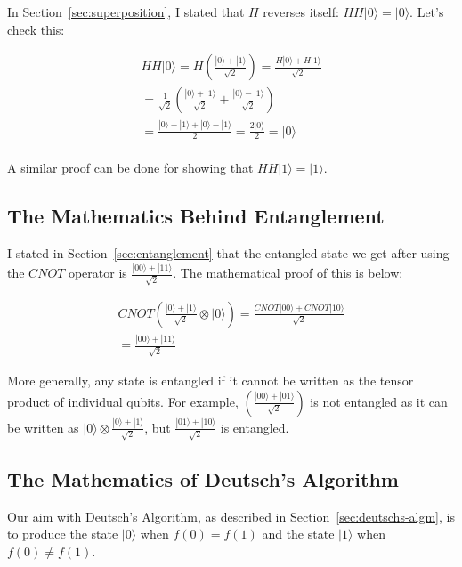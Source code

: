 \documentclass[twocolumn]{article}
\begin{document}
In Section~\ref{sec:superposition}, I stated that $H$ reverses itself: $HH|0\rangle = |0\rangle$. Let's check this:

\begin{gather*}
    HH|0\rangle = H\left(\frac{|0\rangle + |1\rangle}{\sqrt{2}}\right) = \frac{H|0\rangle + H|1\rangle}{\sqrt{2}}\\
    = \frac{1}{\sqrt{2}}\left(\frac{|0\rangle + |1\rangle}{\sqrt{2}} + \frac{|0\rangle - |1\rangle}{\sqrt{2}}\right)\\
    = \frac{|0\rangle + |1\rangle + |0\rangle - |1\rangle}{2} = \frac{2|0\rangle}{2} = |0\rangle\\
\end{gather*}

A similar proof can be done for showing that $HH|1\rangle = |1\rangle$.

\subsection{The Mathematics Behind Entanglement}
\label{subsec:maths-entanglement}

I stated in Section~\ref{sec:entanglement} that the entangled state we get after using the $CNOT$ operator is $\frac{|00\rangle + |11\rangle}{\sqrt{2}}$. The mathematical proof of this is below:

\begin{gather*}
CNOT\left(\frac{|0\rangle + |1\rangle}{\sqrt{2}}\otimes |0\rangle\right) = \frac{CNOT|00\rangle + CNOT|10\rangle}{\sqrt{2}}\\
= \frac{|00\rangle + |11\rangle}{\sqrt{2}}
\end{gather*}

More generally, any state is entangled if it cannot be written as the tensor product of individual qubits. For example, $(\frac{|00\rangle + |01\rangle}{\sqrt{2}})$ is not entangled as it can be written as $|0\rangle \otimes \frac{|0\rangle + |1\rangle}{\sqrt{2}}$, but $\frac{|01\rangle + |10\rangle}{\sqrt{2}}$ is entangled.

\subsection{The Mathematics of Deutsch's Algorithm}
\label{subsec:maths-deutschs-algm}

Our aim with Deutsch's Algorithm, as described in Section~\ref{sec:deutschs-algm}, is to produce the state $|0\rangle$ when $f(0) = f(1)$ and the state $|1\rangle$ when $f(0) \neq f(1)$.
\end{document}
